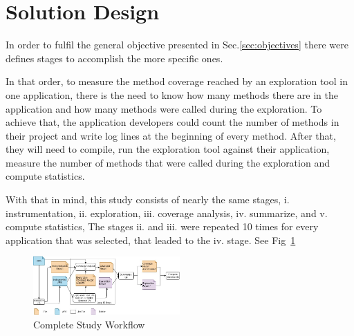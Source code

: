 \section{Solution Design}
\label{sec:study}

In order to fulfil the general objective presented in Sec.\ref{sec:objectives} there were defines stages to accomplish the more specific ones. 

In that order, to measure the method coverage reached by an exploration tool in one application, there is the need to know how many methods there are in the application and how many methods were called during the exploration. To achieve that, the application developers could count the number of methods in their project and write log lines at the beginning of every method. After that, they will need to compile, run the exploration tool against their application, measure the number of methods that were called during the exploration and compute statistics.

With that in mind, this study consists of nearly the same stages, i. instrumentation, ii. exploration, iii. coverage analysis, iv. summarize, and v. compute statistics, The stages ii. and iii. were repeated 10 times for every application that was selected, that leaded to the iv. stage. See Fig~\ref{fig:workFlow}

\begin{figure}[h]
	\centering
	\includegraphics[width=0.5\textwidth]{img/workflow.jpg}
	\vspace{-0.5cm}
	\caption{Complete Study Workflow}
	\label{fig:workFlow}
\end{figure} 


